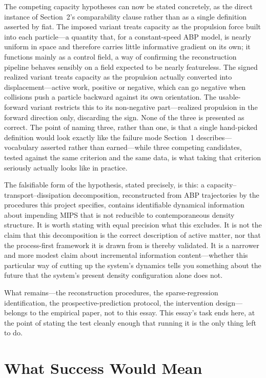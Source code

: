 \documentclass[11pt]{article}
\begin{document}
The competing capacity hypotheses can now be stated concretely, as the direct instance of Section~2's comparability clause rather than as a single definition asserted by fiat. The imposed variant treats capacity as the propulsion force built into each particle---a quantity that, for a constant-speed ABP model, is nearly uniform in space and therefore carries little informative gradient on its own; it functions mainly as a control field, a way of confirming the reconstruction pipeline behaves sensibly on a field expected to be nearly featureless. The signed realized variant treats capacity as the propulsion actually converted into displacement---active work, positive or negative, which can go negative when collisions push a particle backward against its own orientation. The usable-forward variant restricts this to its non-negative part---realized propulsion in the forward direction only, discarding the sign. None of the three is presented as correct. The point of naming three, rather than one, is that a single hand-picked definition would look exactly like the failure mode Section~1 describes---vocabulary asserted rather than earned---while three competing candidates, tested against the same criterion and the same data, is what taking that criterion seriously actually looks like in practice.

The falsifiable form of the hypothesis, stated precisely, is this: a capacity--transport--dissipation decomposition, reconstructed from ABP trajectories by the procedures this project specifies, contains identifiable dynamical information about impending MIPS that is not reducible to contemporaneous density structure. It is worth stating with equal precision what this excludes. It is not the claim that this decomposition is the correct description of active matter, nor that the process-first framework it is drawn from is thereby validated. It is a narrower and more modest claim about incremental information content---whether this particular way of cutting up the system's dynamics tells you something about the future that the system's present density configuration alone does not.

What remains---the reconstruction procedures, the sparse-regression identification, the prospective-prediction protocol, the intervention design---belongs to the empirical paper, not to this essay. This essay's task ends here, at the point of stating the test cleanly enough that running it is the only thing left to do.

\section{What Success Would Mean}
\end{document}
